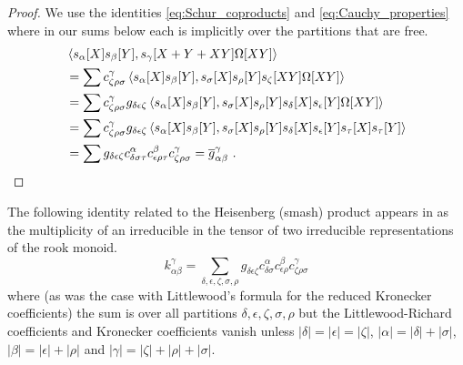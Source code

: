 \documentclass{amsart}
\theoremstyle{definition}
\begin{document}
\begin{proof} We use the identities \eqref{eq:Schur_coproducts}
and \eqref{eq:Cauchy_properties}
where in our sums below each is implicitly over the partitions that are free.
\begin{align*}
&\left< s_\alpha[X] s_\beta[Y], s_\gamma[X+Y+XY] \Omega[XY] \right>\\
&=\sum c^\gamma_{\zeta\rho\sigma} \left< s_\alpha[X] s_\beta[Y], s_\sigma[X]s_\rho[Y]s_\zeta[XY] \Omega[XY] \right>\\
&= \sum c^\gamma_{\zeta\rho\sigma}
g_{\delta\epsilon\zeta} \left< s_\alpha[X] s_\beta[Y], s_\sigma[X]s_\rho[Y]s_\delta[X]s_\epsilon[Y] \Omega[XY] \right>\\
&= \sum c^\gamma_{\zeta\rho\sigma}
g_{\delta\epsilon\zeta} \left< s_\alpha[X] s_\beta[Y], s_\sigma[X]s_\rho[Y]s_\delta[X]s_\epsilon[Y] s_\tau[X] s_\tau[Y] \right>\\
&=\sum
g_{\delta\epsilon\zeta} c^\alpha_{\delta\sigma\tau} c^\beta_{\epsilon\rho\tau} c^\gamma_{\zeta\rho\sigma}
= \overline{g}_{\alpha\beta}^\gamma~. \qedhere
\end{align*}
\end{proof}


The following identity related to the Heisenberg (smash) product appears in
\cite[Theorem 1]{MS25} as the multiplicity of an irreducible
in the tensor of two irreducible representations
of the rook monoid.
\begin{equation} \label{eq:rook_kronecker}
k_{\alpha\beta}^\gamma = \sum_{\delta,\epsilon,\zeta, \sigma, \rho}
g_{\delta\epsilon\zeta} c^\alpha_{\delta\sigma} c^\beta_{\epsilon\rho} c^\gamma_{\zeta\rho\sigma}
\end{equation}
where (as was the case with Littlewood's formula for the reduced Kronecker coefficients)
the sum is over all partitions $\delta,\epsilon,\zeta, \sigma, \rho$
but the Littlewood-Richard coefficients and Kronecker coefficients vanish unless
$|\delta|=|\epsilon|=|\zeta|$, $|\alpha|=|\delta|+|\sigma|$, $|\beta|=|\epsilon|+|\rho|$
and $|\gamma|=|\zeta|+|\rho|+|\sigma|$.
\end{document}
